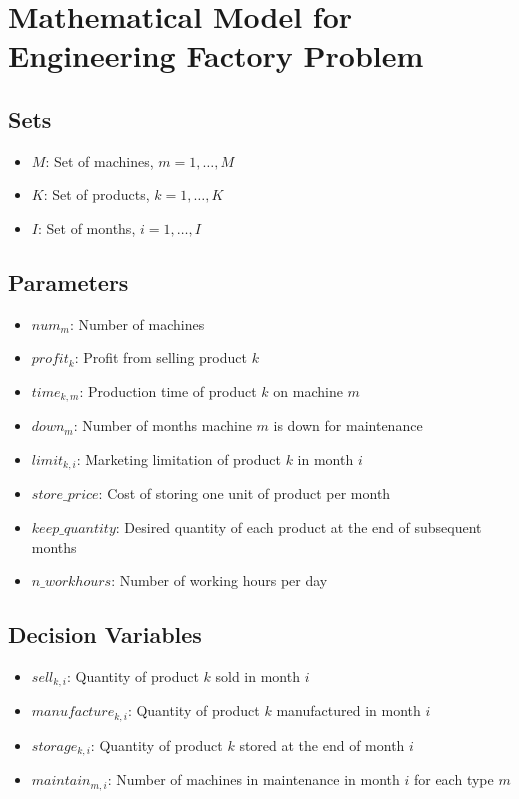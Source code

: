 \documentclass{article}
\begin{document}
\section*{Mathematical Model for Engineering Factory Problem}

\subsection*{Sets}
\begin{itemize}
    \item $M$: Set of machines, $m = 1, \ldots, M$
    \item $K$: Set of products, $k = 1, \ldots, K$
    \item $I$: Set of months, $i = 1, \ldots, I$
\end{itemize}

\subsection*{Parameters}
\begin{itemize}
    \item $num_m$: Number of machines
    \item $profit_k$: Profit from selling product $k$
    \item $time_{k,m}$: Production time of product $k$ on machine $m$
    \item $down_m$: Number of months machine $m$ is down for maintenance
    \item $limit_{k,i}$: Marketing limitation of product $k$ in month $i$
    \item $store\_price$: Cost of storing one unit of product per month
    \item $keep\_quantity$: Desired quantity of each product at the end of subsequent months
    \item $n\_workhours$: Number of working hours per day
\end{itemize}

\subsection*{Decision Variables}
\begin{itemize}
    \item $sell_{k,i}$: Quantity of product $k$ sold in month $i$
    \item $manufacture_{k,i}$: Quantity of product $k$ manufactured in month $i$
    \item $storage_{k,i}$: Quantity of product $k$ stored at the end of month $i$
    \item $maintain_{m,i}$: Number of machines in maintenance in month $i$ for each type $m$
\end{itemize}
\end{document}
